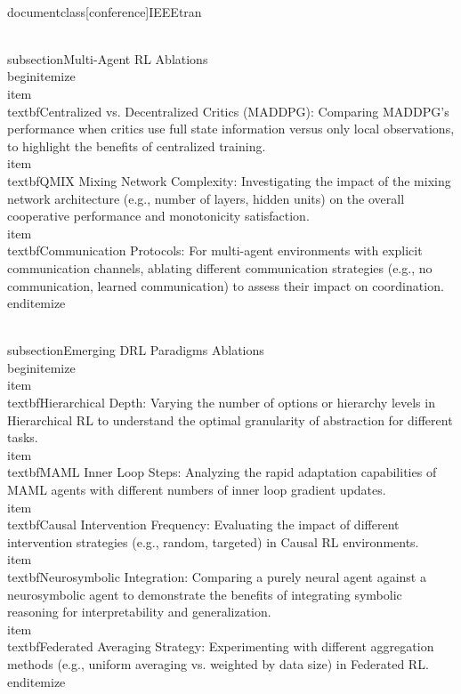 \\documentclass[conference]{IEEEtran}
\begin{document}
\\subsection{Multi-Agent RL Ablations}
\\begin{itemize}
    \\item \\textbf{Centralized vs. Decentralized Critics (MADDPG):} Comparing MADDPG's performance when critics use full state information versus only local observations, to highlight the benefits of centralized training.
    \\item \\textbf{QMIX Mixing Network Complexity:} Investigating the impact of the mixing network architecture (e.g., number of layers, hidden units) on the overall cooperative performance and monotonicity satisfaction.
    \\item \\textbf{Communication Protocols:} For multi-agent environments with explicit communication channels, ablating different communication strategies (e.g., no communication, learned communication) to assess their impact on coordination.
\\end{itemize}

\\subsection{Emerging DRL Paradigms Ablations}
\\begin{itemize}
    \\item \\textbf{Hierarchical Depth:} Varying the number of options or hierarchy levels in Hierarchical RL to understand the optimal granularity of abstraction for different tasks.
    \\item \\textbf{MAML Inner Loop Steps:} Analyzing the rapid adaptation capabilities of MAML agents with different numbers of inner loop gradient updates.
    \\item \\textbf{Causal Intervention Frequency:} Evaluating the impact of different intervention strategies (e.g., random, targeted) in Causal RL environments.
    \\item \\textbf{Neurosymbolic Integration:} Comparing a purely neural agent against a neurosymbolic agent to demonstrate the benefits of integrating symbolic reasoning for interpretability and generalization.
    \\item \\textbf{Federated Averaging Strategy:} Experimenting with different aggregation methods (e.g., uniform averaging vs. weighted by data size) in Federated RL.
\\end{itemize}
\end{document}
